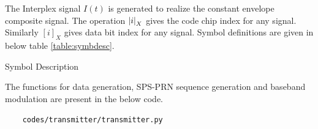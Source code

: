 \noindent The Interplex signal $I(t)$ is generated to realize the constant envelope composite signal. The operation $\left\vert i\right\vert_X$ gives the code chip index for any signal. Similarly $[i]_X$ gives data bit index for any signal.
Symbol definitions are given in below table \ref{table:symbdesc}.

\begin{table}[h]

\vspace{3mm}
\caption{Symbol Description}
\label{table:symbdesc}
\end{table}

The functions for data generation, SPS-PRN sequence generation and baseband modulation are present in the below code.
\begin{lstlisting}
    codes/transmitter/transmitter.py
\end{lstlisting}
\let\cleardoublepage\clearpage
